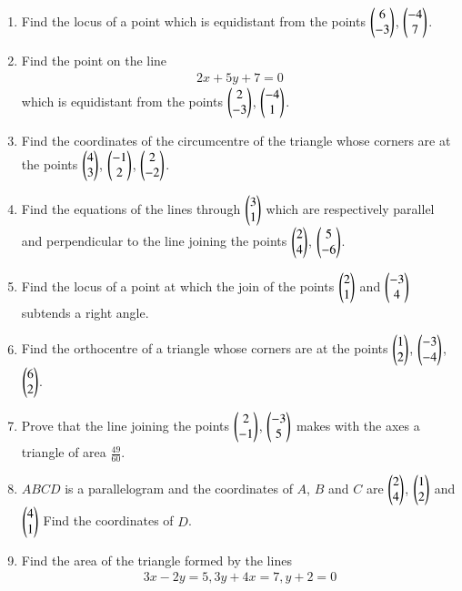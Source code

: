 \renewcommand{\theequation}{\theenumi}
\begin{enumerate}[label=\arabic*.,ref=\thesubsection.\theenumi]
\item Find the locus of a point which is equidistant from the points $\begin{pmatrix}6\\-3\end{pmatrix}$, $\begin{pmatrix}-4\\7\end{pmatrix}$.
\item Find the point on the line
\begin{align*}
2x+5y+7=0
\end{align*}
which is equidistant from the points $\begin{pmatrix}2\\-3\end{pmatrix}$, $\begin{pmatrix}-4\\1\end{pmatrix}$.
\item Find the coordinates of the circumcentre of the triangle whose corners are at the points $\begin{pmatrix}4\\3\end{pmatrix}$, $\begin{pmatrix}-1\\2\end{pmatrix}$, $\begin{pmatrix}2\\-2\end{pmatrix}$.
\item Find the equations of the lines through $\begin{pmatrix}3\\1\end{pmatrix}$ which are respectively parallel and perpendicular to the line joining the points $\begin{pmatrix}2\\4\end{pmatrix}$, $\begin{pmatrix}5\\-6\end{pmatrix}$.
\item Find the locus of a point at which the join of the points $\begin{pmatrix}2\\1\end{pmatrix}$ and $\begin{pmatrix}-3\\4\end{pmatrix}$ subtends a right angle.
\item Find the orthocentre of a triangle whose corners are at the points $\begin{pmatrix}1\\2\end{pmatrix}$, $\begin{pmatrix}-3\\-4\end{pmatrix}$, $\begin{pmatrix}6\\2\end{pmatrix}$.
\item Prove that the line joining the points $\begin{pmatrix}2\\-1\end{pmatrix}$, $\begin{pmatrix}-3\\5\end{pmatrix}$ makes with the axes a triangle of area $\frac{49}{60}$.
\item $ABCD$ is a parallelogram and the coordinates of $A$, $B$ and $C$ are $\begin{pmatrix}2\\4\end{pmatrix}$, $\begin{pmatrix}1\\2\end{pmatrix}$ and $\begin{pmatrix}4\\1\end{pmatrix}$ Find the coordinates of $D$.
\item Find the area of the triangle formed by the lines 
\begin{align*}
3x-2y=5, 3y+4x=7, y +2 = 0

\end{align*}
\end{enumerate}
